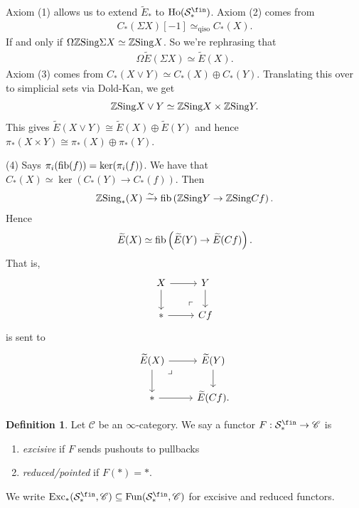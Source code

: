 \documentclass[12pt]{amsart}
\let\til\widetilde
\theoremstyle{definition}
\newtheorem{definition}[theorem]{Definition}
\providecommand{\Exc}{\text{Exc}}
\begin{document}
Axiom (1) allows us to extend $\til{E}_\ast$ to $\Ho(\mathcal{S}_\ast^\fin)$. Axiom (2) comes from
\begin{align*}
    C_\ast(\Sigma X)[-1]\simeq_{\text{qiso}} C_\ast(X).
\end{align*}
If and only if $\Omega \mathbb{Z} \text{Sing} \Sigma X \simeq \mathbb{Z} \text{Sing} X$. So we're rephrasing that
\begin{align*}
    \Omega \til{E}(\Sigma X) \simeq \til{E}(X).
\end{align*}
Axiom (3) comes from $C_\ast(X\vee Y) \simeq C_\ast(X) \oplus C_\ast(Y)$. Translating this over to simplicial sets via Dold-Kan, we get
\begin{align*}
    \mathbb{Z}\text{Sing} X \vee Y \simeq \mathbb{Z}\text{Sing} X \times \mathbb{Z} \text{Sing} Y.
\end{align*}
This gives $\til{E}(X \vee Y) \cong \til{E}(X) \oplus \til{E}(Y)$ and hence $\pi_\ast(X \times Y) \cong \pi_\ast(X) \oplus \pi_\ast(Y)$.

(4) Says $\pi_i(\text{fib}(f)) = \ker(\pi_i(f))$. We have that $C_\ast(X) \simeq \ker \left( C_\ast(Y) \to C_\ast(f) \right)$. Then
\begin{align*}
    \mathbb{Z}\text{Sing}_\ast(X) \xrightarrow{\sim} \text{fib} \left( \mathbb{Z}\text{Sing} Y \to \mathbb{Z} \text{Sing} Cf \right).
\end{align*}
Hence
\begin{align*}
    \til{E}(X) \simeq \fib \left( \til{E}(Y) \to \til{E}(Cf) \right).
\end{align*}
That is,
\[ \begin{tikzcd}
    X\rar\dar & Y\dar\\
    \ast\rar & Cf\po
\end{tikzcd} \]
is sent to
\[ \begin{tikzcd}
    \til{E}(X)\rar\dar\pb & \til{E}(Y)\dar\\
    \ast\rar & \til{E}(Cf).
\end{tikzcd} \]

\begin{definition} Let $\mathscr{C}$ be an $\infty$-category. We say a functor $F: \mathcal{S}_\ast^\fin \to \mathscr{C}$ is
\begin{enumerate}
    \item \textit{excisive} if $F$ sends pushouts to pullbacks
    \item \textit{reduced/pointed} if $F(\ast) = \ast$.
\end{enumerate}
\end{definition}

We write $\Exc_\ast(\mathcal{S}_\ast^\fin,\mathscr{C}) \subseteq \Fun(\mathcal{S}_\ast^\fin, \mathscr{C})$ for excisive and reduced functors.
\end{document}
